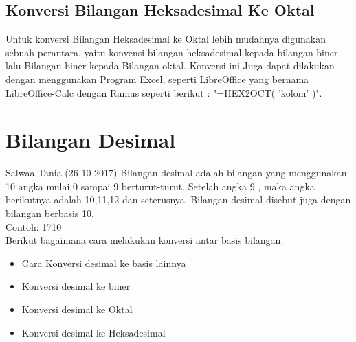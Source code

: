 {\subsection{Konversi Bilangan Heksadesimal Ke Oktal}
Untuk konversi Bilangan Heksadesimal ke Oktal lebih mudahnya digunakan sebuah perantara, yaitu konvensi bilangan heksadesimal kepada bilangan biner lalu Bilangan biner kepada Bilangan oktal.
Konversi ini Juga dapat dilakukan dengan menggunakan Program Excel, seperti LibreOffice yang bernama LibreOffice-Calc dengan Rumus seperti berikut :  "=HEX2OCT( 'kolom' )".

\section{Bilangan Desimal} Salwaa Tania (26-10-2017)
Bilangan desimal adalah bilangan yang menggunakan 10 angka mulai 0 sampai 9 berturut-turut. Setelah angka 9 , maka angka berikutnya adalah 10,11,12 dan seterusnya. Bilangan desimal disebut juga dengan bilangan berbasis 10.
\\Contoh: 1710
\\Berikut bagaimana cara melakukan konversi antar basis bilangan: 
\begin{itemize}
	\item Cara Konversi desimal ke basis lainnya
	\item Konversi desimal ke biner
	\item Konversi desimal ke Oktal
	\item Konversi desimal ke Heksadesimal
\end{itemize}
}
